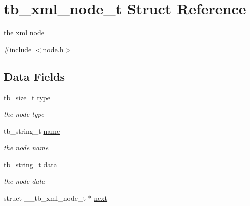 \hypertarget{structtb__xml__node__t}{\section{tb\-\_\-xml\-\_\-node\-\_\-t Struct Reference}
\label{structtb__xml__node__t}
}


the xml node  




{\ttfamily \#include $<$node.\-h$>$}

\subsection*{Data Fields}
\begin{DoxyCompactItemize}
\item 
\hypertarget{structtb__xml__node__t_a95ff756947e0cf326bee99c22534703d}{tb\-\_\-size\-\_\-t \hyperlink{structtb__xml__node__t_a95ff756947e0cf326bee99c22534703d}{type}}\label{structtb__xml__node__t_a95ff756947e0cf326bee99c22534703d}

\begin{DoxyCompactList}\small\item\em the node type \end{DoxyCompactList}\item 
\hypertarget{structtb__xml__node__t_a609342a5031047dbecfa082736d7ef51}{tb\-\_\-string\-\_\-t \hyperlink{structtb__xml__node__t_a609342a5031047dbecfa082736d7ef51}{name}}\label{structtb__xml__node__t_a609342a5031047dbecfa082736d7ef51}

\begin{DoxyCompactList}\small\item\em the node name \end{DoxyCompactList}\item 
\hypertarget{structtb__xml__node__t_a3f33f75bf48a9a85166f88500ffcd501}{tb\-\_\-string\-\_\-t \hyperlink{structtb__xml__node__t_a3f33f75bf48a9a85166f88500ffcd501}{data}}\label{structtb__xml__node__t_a3f33f75bf48a9a85166f88500ffcd501}

\begin{DoxyCompactList}\small\item\em the node data \end{DoxyCompactList}\item 
\hypertarget{structtb__xml__node__t_aa2283c0ea0b534025260797b299304e3}{struct \-\_\-\-\_\-tb\-\_\-xml\-\_\-node\-\_\-t $\ast$ \hyperlink{structtb__xml__node__t_aa2283c0ea0b534025260797b299304e3}{next}}\label{structtb__xml__node__t_aa2283c0ea0b534025260797b299304e3}


\end{DoxyCompactItemize}
